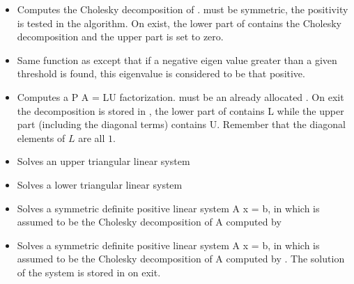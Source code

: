 \begin{itemize}
\item {}
  \sshortdescribe Computes the Cholesky decomposition of .  must
  be symmetric, the positivity is tested in the algorithm. On exist, the lower
  part of  contains the Cholesky decomposition and the upper part is
  set to zero.

\item {}
  \sshortdescribe Same function as  except that if a negative
  eigen value greater than a given threshold is found, this eigenvalue is
  considered to be that positive.

\item {} 
  \sshortdescribe Computes a P A = LU factorization.  must be an
  already allocated  . On exit the decomposition is
  stored in , the lower part of  contains L while the upper part
  (including the diagonal terms) contains U. Remember that the diagonal
  elements of $L$ are all $1$.

\item {}
  \sshortdescribe Solves an upper triangular linear system 

\item {}
  \sshortdescribe Solves a lower triangular linear system  
  
\item {} 
  \sshortdescribe Solves a symmetric definite positive linear system A x = b, 
  in which  is assumed to be the Cholesky decomposition of A
  computed by 

\item {} 
  \sshortdescribe Solves a symmetric definite positive linear system A x = b, 
  in which  is assumed to be the Cholesky decomposition of A
  computed by . The solution of the system is stored in
   on exit.


\end{itemize}
